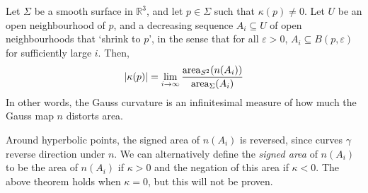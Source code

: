 \documentclass[a4paper,11pt]{article}
\begin{document}
\begin{theorem}
	Let \( \Sigma \) be a smooth surface in \( \mathbb R^3 \), and let \( p \in \Sigma \) such that \( \kappa(p) \neq 0 \).
	Let \( U \) be an open neighbourhood of \( p \), and a decreasing sequence \( A_i \subseteq U \) of open neighbourhoods that `shrink to \( p \)', in the sense that for all \( \varepsilon > 0 \), \( A_i \subseteq B(p,\varepsilon) \) for sufficiently large \( i \).
	Then,
	\[
		\abs{\kappa(p)} = \lim_{i \to \infty} \frac{\mathrm{area}_{S^2} (n(A_i))}{\mathrm{area}_{\Sigma} (A_i)}
	\]
	In other words, the Gauss curvature is an infinitesimal measure of how much the Gauss map \( n \) distorts area.
\end{theorem}
\begin{remark}
	Around hyperbolic points, the signed area of \( n(A_i) \) is reversed, since curves \( \gamma \) reverse direction under \( n \).
	We can alternatively define the \textit{signed area} of \( n(A_i) \) to be the area of \( n(A_i) \) if \( \kappa > 0 \) and the negation of this area if \( \kappa < 0 \).
	The above theorem holds when \( \kappa = 0 \), but this will not be proven.
\end{remark}
\end{document}

